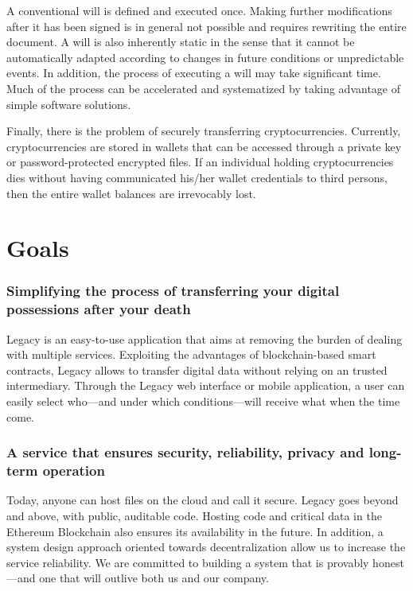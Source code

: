 A conventional will is defined and executed once. Making further modifications after it has been signed is in general not possible and requires rewriting the entire document. A will is also inherently static in the sense that it cannot be automatically adapted according to changes in future conditions or unpredictable events. In addition, the process of executing a will may take significant time. Much of the process can be accelerated and systematized by taking advantage of simple software solutions. 

Finally, there is the problem of securely transferring cryptocurrencies. Currently, cryptocurrencies are stored in wallets that can be accessed through a private key or password-protected encrypted files. If an individual holding cryptocurrencies dies without having communicated his/her wallet credentials to third persons, then the entire wallet balances are irrevocably lost. 


\section{Goals} %
\label{sec:goals}

\subsubsection*{Simplifying the process of transferring your digital possessions after your death} %
\label{ssub:simplifying_the_process_of_transferring_your_digital_possessions_after_your_death}
Legacy is an easy-to-use application that aims at removing the burden of dealing with multiple services. Exploiting the advantages of blockchain-based smart contracts, Legacy allows to transfer digital data without relying on an trusted intermediary.  
Through the Legacy web interface or mobile application, a user can easily select who---and under which conditions---will receive what when the time come.

\subsubsection*{A service that ensures security, reliability, privacy and long-term operation} %
\label{ssub:a_service_that_ensures_security_reliability_privacy_and_long_term_operation}
Today, anyone can host files on the cloud and call it secure. Legacy goes beyond and above, with public, auditable code. Hosting code and critical data in the Ethereum Blockchain also ensures its availability in the future. In addition, a system design approach oriented towards decentralization allow us to increase the service reliability.
We are committed to building a system that is provably honest---and one that will outlive both us and our company.

